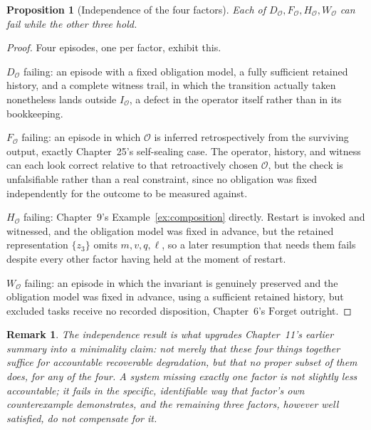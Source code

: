 \documentclass[11pt]{report}
\newtheorem{proposition}[definition]{Proposition}
\newtheorem{remark}[definition]{Remark}
\newcommand{\Forget}{\mathrm{Forget}}
\begin{document}
\begin{proposition}[Independence of the four factors]
Each of $D_{\mathcal O}, F_{\mathcal O}, H_{\mathcal O}, W_{\mathcal O}$ can fail while the other three hold.
\end{proposition}
\begin{proof}
Four episodes, one per factor, exhibit this.

$D_{\mathcal O}$ failing: an episode with a fixed obligation model, a fully sufficient retained history, and a complete witness trail, in which the transition actually taken nonetheless lands outside $I_{\mathcal O}$, a defect in the operator itself rather than in its bookkeeping.

$F_{\mathcal O}$ failing: an episode in which $\mathcal O$ is inferred retrospectively from the surviving output, exactly Chapter~25's self-sealing case. The operator, history, and witness can each look correct relative to that retroactively chosen $\mathcal O$, but the check is unfalsifiable rather than a real constraint, since no obligation was fixed independently for the outcome to be measured against.

$H_{\mathcal O}$ failing: Chapter~9's Example~\ref{ex:composition} directly. Restart is invoked and witnessed, and the obligation model was fixed in advance, but the retained representation $\{z_3\}$ omits $m, v, q, \ell$, so a later resumption that needs them fails despite every other factor having held at the moment of restart.

$W_{\mathcal O}$ failing: an episode in which the invariant is genuinely preserved and the obligation model was fixed in advance, using a sufficient retained history, but excluded tasks receive no recorded disposition, Chapter~6's $\Forget$ outright.
\end{proof}

\begin{remark}
The independence result is what upgrades Chapter~11's earlier summary into a minimality claim: not merely that these four things together suffice for accountable recoverable degradation, but that no proper subset of them does, for any of the four. A system missing exactly one factor is not slightly less accountable; it fails in the specific, identifiable way that factor's own counterexample demonstrates, and the remaining three factors, however well satisfied, do not compensate for it.
\end{remark}
\end{document}
